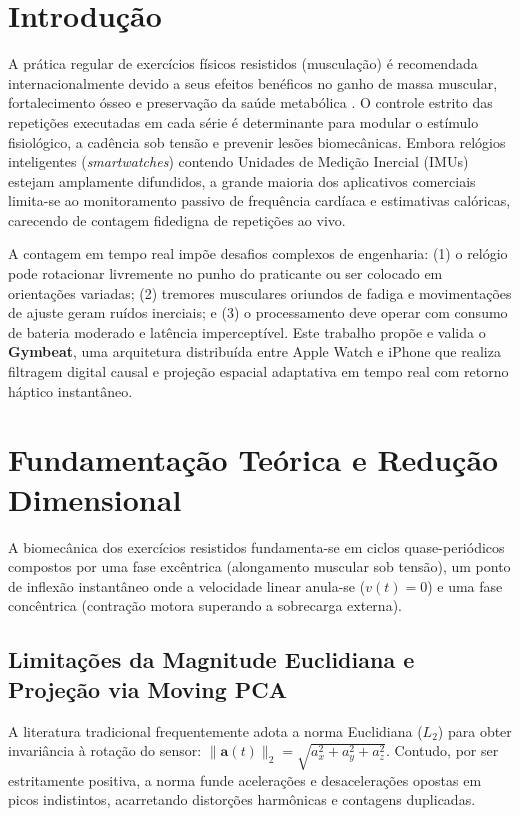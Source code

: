\documentclass[12pt]{article}
\begin{document}
\section{Introdução}

A prática regular de exercícios físicos resistidos (musculação) é recomendada internacionalmente devido a seus efeitos benéficos no ganho de massa muscular, fortalecimento ósseo e preservação da saúde metabólica \cite{acsm2018}. O controle estrito das repetições executadas em cada série é determinante para modular o estímulo fisiológico, a cadência sob tensão e prevenir lesões biomecânicas. Embora relógios inteligentes (\textit{smartwatches}) contendo Unidades de Medição Inercial (IMUs) estejam amplamente difundidos, a grande maioria dos aplicativos comerciais limita-se ao monitoramento passivo de frequência cardíaca e estimativas calóricas, carecendo de contagem fidedigna de repetições ao vivo.

A contagem em tempo real impõe desafios complexos de engenharia: (1) o relógio pode rotacionar livremente no punho do praticante ou ser colocado em orientações variadas; (2) tremores musculares oriundos de fadiga e movimentações de ajuste geram ruídos inerciais; e (3) o processamento deve operar com consumo de bateria moderado e latência imperceptível. Este trabalho propõe e valida o \textbf{Gymbeat}, uma arquitetura distribuída entre Apple Watch e iPhone que realiza filtragem digital causal e projeção espacial adaptativa em tempo real com retorno háptico instantâneo.

\section{Fundamentação Teórica e Redução Dimensional}

A biomecânica dos exercícios resistidos fundamenta-se em ciclos quase-periódicos compostos por uma fase excêntrica (alongamento muscular sob tensão), um ponto de inflexão instantâneo onde a velocidade linear anula-se ($v(t)=0$) e uma fase concêntrica (contração motora superando a sobrecarga externa).

\subsection{Limitações da Magnitude Euclidiana e Projeção via Moving PCA}
A literatura tradicional frequentemente adota a norma Euclidiana ($L_2$) para obter invariância à rotação do sensor: $\|\mathbf{a}(t)\|_2 = \sqrt{a_x^2 + a_y^2 + a_z^2}$. Contudo, por ser estritamente positiva, a norma funde acelerações e desacelerações opostas em picos indistintos, acarretando distorções harmônicas e contagens duplicadas.
\end{document}
